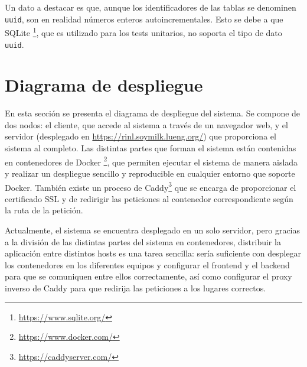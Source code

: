 Un dato a destacar es que, aunque los identificadores de las tablas se denominen \texttt{uuid},
son en realidad números enteros autoincrementales. Esto se debe a que SQLite%
\footnote{\url{https://www.sqlite.org/}}, que es utilizado para los tests unitarios, no soporta el
tipo de dato \texttt{uuid}.



\section{Diagrama de despliegue}
\label{anexo2:sec:diagrama-despliegue}
En esta sección se presenta el diagrama de despliegue del sistema. Se compone de dos nodos: el
cliente, que accede al sistema a través de un navegador web, y el servidor (desplegado en
\url{https://rinl.soymilk.lueng.org/}) que proporciona el sistema al completo. Las distintas
partes que forman el sistema están contenidas en contenedores de Docker%
\footnote{\url{https://www.docker.com/}}, que permiten ejecutar el sistema de manera aislada y
realizar un despliegue sencillo y reproducible en cualquier entorno que soporte Docker. También
existe un proceso de Caddy\footnote{\url{https://caddyserver.com/}} que se encarga de
proporcionar el certificado SSL y de redirigir las peticiones al contenedor correspondiente
según la ruta de la petición.

Actualmente, el sistema se encuentra desplegado en un solo servidor, pero gracias a la división
de las distintas partes del sistema en contenedores, distribuir la aplicación entre distintos
hosts es una tarea sencilla: sería suficiente con desplegar los contenedores en los diferentes
equipos y configurar el \gls{frontend} y el \gls{backend} para que se comuniquen entre ellos
correctamente, así como configurar el proxy inverso de Caddy para que redirija las peticiones
a los lugares correctos.


